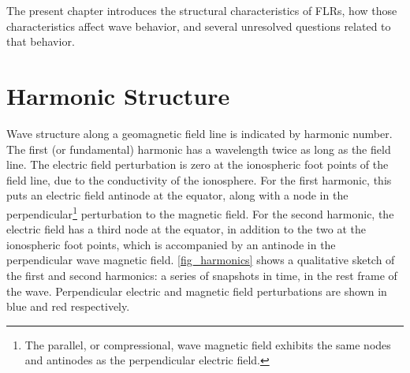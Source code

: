 The present chapter introduces the structural characteristics of FLRs, how
those characteristics affect wave behavior, and several unresolved questions
related to that behavior. 



\section{Harmonic Structure}
  \label{sec_harmonics}



Wave structure along a geomagnetic field line is indicated by harmonic number.
The first (or fundamental) harmonic has a wavelength twice as long as the field
line. The electric field perturbation is zero at the ionospheric foot points of
the field line, due to the conductivity of the ionosphere. For the first
harmonic, this puts an electric field antinode at the equator, along with a
node in the perpendicular\footnote{The parallel, or compressional, wave
magnetic field exhibits the same nodes and antinodes as the perpendicular
electric field\cite{radoski_1974}. } perturbation to the magnetic field. For
the second harmonic, the electric field has a third node at the equator, in
addition to the two at the ionospheric foot points, which is accompanied by an
antinode in the perpendicular wave magnetic field. \cref{fig_harmonics} shows a
qualitative sketch of the first and second harmonics: a series of snapshots in
time, in the rest frame of the wave. Perpendicular electric and magnetic field
perturbations are shown in blue and red respectively. 

